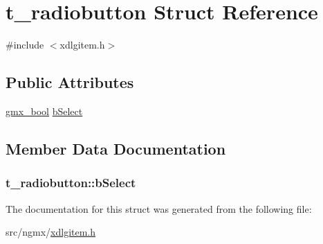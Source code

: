 \hypertarget{structt__radiobutton}{\section{t\-\_\-radiobutton \-Struct \-Reference}
\label{structt__radiobutton}
}


{\ttfamily \#include $<$xdlgitem.\-h$>$}

\subsection*{\-Public \-Attributes}
\begin{DoxyCompactItemize}
\item 
\hyperlink{include_2types_2simple_8h_a8fddad319f226e856400d190198d5151}{gmx\-\_\-bool} \hyperlink{structt__radiobutton_a87eb987a4dfd0694f9e084010525f62c}{b\-Select}
\end{DoxyCompactItemize}


\subsection{\-Member \-Data \-Documentation}
\hypertarget{structt__radiobutton_a87eb987a4dfd0694f9e084010525f62c}{
\subsubsection[{b\-Select}]{ {\bf t\-\_\-radiobutton\-::b\-Select}}}\label{structt__radiobutton_a87eb987a4dfd0694f9e084010525f62c}


\-The documentation for this struct was generated from the following file\-:\begin{DoxyCompactItemize}
\item 
src/ngmx/\hyperlink{xdlgitem_8h}{xdlgitem.\-h}\end{DoxyCompactItemize}
